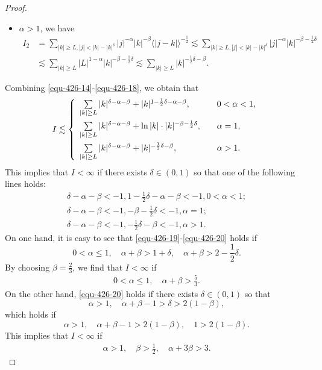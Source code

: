 \documentclass[12pt]{amsart}
\theoremstyle{definition}
\numberwithin{equation}{section}
\begin{document}
\begin{proof}
\begin{itemize}
       \item $\alpha>1$, we have
    \begin{align}\label{equ-426-18}
          I_2&= \sum_{|k|\ge L,|j|<|k|-|k|^\delta}|j|^{-\alpha}|k|^{-\beta}\langle |j-k|\rangle^{-\frac{1}{2}}\lesssim \sum_{|k|\ge L,|j|<|k|-|k|^{\delta}}|j|^{-\alpha}|k|^{-\beta-\frac{1}{2}\delta}\nonumber\\
          &\lesssim \sum_{|k|\ge L }|L|^{1-\alpha}|k|^{-\beta-\frac{1}{2}\delta}\lesssim\sum_{|k|\ge L}|k|^{-\frac{1}{2}\delta-\beta}.
    \end{align}
     \end{itemize}
Combining \eqref{equ-426-14}-\eqref{equ-426-18}, we obtain that
\begin{align*}
I\lesssim
\left\{
\begin{array}{ll}
\sum_{|k|\geq L}\limits|k|^{\delta-\alpha-\beta}+ |k|^{1-\frac{1}{2}\delta-\alpha-\beta}, &  \quad 0<\alpha<1,\vspace{1ex}\\
\sum_{|k|\geq L}\limits|k|^{\delta-\alpha-\beta}+ \ln|k|\cdot|k|^{-\beta-\frac{1}{2}\delta}, & \quad \alpha=1,\vspace{1ex}\\
\sum_{|k|\geq L}\limits|k|^{\delta-\alpha-\beta}+|k|^{-\frac{1}{2}\delta-\beta}, & \quad \alpha>1.
\end{array}
\right.
\end{align*}
This implies that $I<\infty$ if there exists $\delta\in(0,1)$ so that one of the following lines holds:
\begin{align}
\delta-\alpha-\beta<-1, 1-\frac{1}{2}\delta-\alpha-\beta<-1,0<\alpha<1; \label{equ-426-19}\\
\delta-\alpha-\beta<-1,-\beta-\frac{1}{2}\delta<-1,\alpha=1; \label{equ-426-20}\\
\delta-\alpha-\beta<-1, -\frac{1}{2}\delta-\beta<-1, \alpha>1. \label{equ-426-21}
\end{align}
On one hand, it is easy to see that \eqref{equ-426-19}-\eqref{equ-426-20} holds if
$$
0<\alpha\leq 1, \quad \alpha+\beta>1+\delta, \quad \alpha+\beta>2-\frac{1}{2}\delta.
$$
By choosing $\beta=\frac{2}{3}$, we find that $I<\infty$ if
\begin{align} \label{equ-426-22}
0<\alpha\leq 1, \quad \alpha+\beta>\frac{5}{3}.
\end{align}
On the other hand, \eqref{equ-426-20} holds if there exists $\delta\in(0,1)$ so that
$$
\alpha>1, \quad \alpha+\beta-1>\delta>2(1-\beta),
$$
which holds if
$$
\alpha>1, \quad \alpha+\beta-1>2(1-\beta), \quad 1>2(1-\beta).
$$
This implies that $I<\infty$ if
\begin{align} \label{equ-426-23}
\alpha>1, \quad \beta>\frac{1}{2}, \quad \alpha+3\beta>3.
\end{align}



\end{proof}
\end{document}
